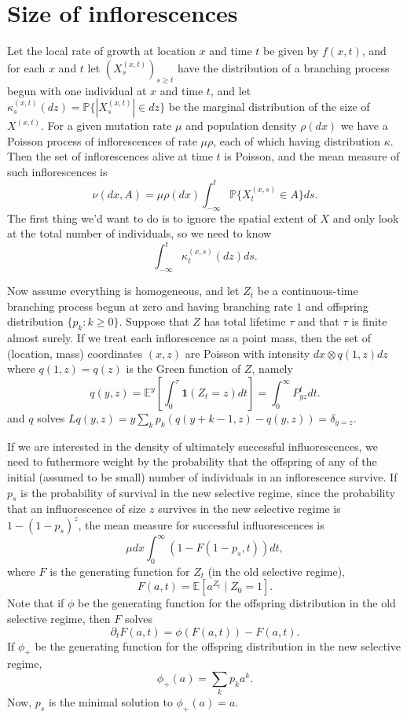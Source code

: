 \documentclass{article}
\renewcommand{\P}{\mathbb{P}}
\newcommand{\E}{\mathbb{E}}
\newcommand{\one}{\mathbf{1}}
\begin{document}
\section{Size of inflorescences}

Let the local rate of growth at location $x$ and time $t$ be given by $f(x,t)$,
and for each $x$ and $t$ let $(X^{(x,t)}_{s})_{s \ge t}$ have the distribution of a branching process begun with one individual at $x$ and time $t$,
and let $\kappa^{(x,t)}_s(dz) = \P\{ |X^{(x,t)}_s| \in dz \}$  be the marginal distribution of the size of $X^{(x,t)}$.
For a given mutation rate $\mu$ and population density $\rho(dx)$ we have a Poisson process of inflorescences of rate $\mu \rho$,
each of which having distribution $\kappa$.  
Then the set of inflorescences alive at time $t$ is Poisson, 
and the mean measure of such inflorescences is
\[ \nu(dx,A) = \mu \rho(dx) \int_{-\infty}^t \P\{ X^{(x,s)}_t \in A \} ds .\]
The first thing we'd want to do is to ignore the spatial extent of $X$ and only look at the total number of individuals,
so we need to know
\[ \int_{-\infty}^t \kappa^{(x,s)}_t(dz) ds . \]

Now assume everything is homogeneous, and let $Z_t$ be a continuous-time branching process begun at zero 
and having branching rate $1$ and offspring distribution $\{p_k : k\ge 0\}$.
Suppose that $Z$ has total lifetime $\tau$ and that $\tau$ is finite almost surely.
If we treat each inflorescence as a point mass, then the set of (location, mass) coordinates $(x,z)$
are Poisson with intensity $dx \otimes q(1,z) dz$ where $q(1,z)=q(z)$ is the Green function of $Z$, namely
\[  
  q(y,z) = \E^y \left[ \int_0^\tau \one(Z_t = z) dt \right] = \int_0^\infty P^t_{yz} dt .
\]
and $q$ solves $L q(y,z) = y \sum_k p_k (q(y+k-1,z)-q(y,z)) = \delta_{y=z}$.

If we are interested in the density of ultimately successful influorescences,
we need to futhermore weight by the probability that the offspring of any of the initial (assumed to be small) number of individuals in an inflorescence survive.
If $p_s$ is the probability of survival in the new selective regime,
since the probability that an influorescence of size $z$ survives in the new selective regime is $1 - (1-p_s)^z$,
the mean measure for successful influorescences is
\[
   \mu dx \int_0^\infty (1-F(1-p_s,t)) dt ,
\]
where $F$ is the generating function for $Z_t$ (in the old selective regime),
\[
  F(a,t) = \E[a^{Z_t} \; | \; Z_0 = 1] .
\]
Note that 
if $\phi$ be the generating function for the offspring distribution in the old selective regime,
then $F$ solves
\[
   \partial_t F(a,t) = \phi(F(a,t)) - F(a,t).
\]
If $\phi_+$ be the generating function for the offspring distribution in the new selective regime,
\[
  \phi_+(a) = \sum_k p_k a^k .
\]
Now, $p_s$ is the minimal solution to $\phi_+(a) = a$.
\end{document}
